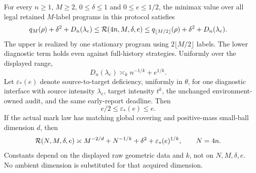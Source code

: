 \begin{theorem}\label{thm:joint}
For every $n\ge1$, $M\ge2$, $0\le\delta\le1$ and $0\le e\le1/2$, the minimax value over all legal retained $M$-label programs in this protocol satisfies
\begin{equation}\label{eq:joint-sandwich}
 q_M(\rho)+\delta^2+D_n(\lambda_e)
 \le\mathcal R(4n,M,\delta,e)
 \le q_{\lfloor M/2\rfloor}(\rho)+\delta^2+D_n(\lambda_e).
\end{equation}
The upper is realized by one stationary program using $2\lfloor M/2\rfloor$ labels. The lower diagnostic term holds even against full-history strategies. Uniformly over the displayed range,
\begin{equation}\label{eq:diagnostic-erasure-rate}
 D_n(\lambda_e)\asymp_k n^{-1/k}+e^{1/k}.
\end{equation}
Let $\varepsilon_*(e)$ denote source-to-target deficiency, uniformly in $\theta$, for one diagnostic interface with source intensity $\lambda_e$, target intensity $t^k$, the unchanged environment-owned audit, and the same early-report deadline. Then
\begin{equation}\label{eq:actual-deficiency}
 e/2\le\varepsilon_*(e)\le e.
\end{equation}
If the actual mark law has matching global covering and positive-mass small-ball dimension $d$, then
\begin{equation}\label{eq:joint-law}
 \mathcal R(N,M,\delta,e)
 \asymp M^{-2/d}+N^{-1/k}+\delta^2+\varepsilon_*(e)^{1/k},\qquad N=4n.
\end{equation}
Constants depend on the displayed raw geometric data and $k$, not on $N,M,\delta,e$. No ambient dimension is substituted for that acquired dimension.
\end{theorem}
